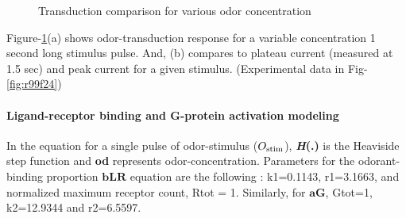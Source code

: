 \documentclass[
]{article}
\begin{document}
\begin{figure}

{\centering {}

}

\caption{Transduction comparison for various odor concentration}\label{fig:txCon}
\end{figure}

Figure-\ref{fig:txCon}(a) shows odor-transduction response for a variable concentration 1 second long stimulus pulse. And, (b) compares to plateau current (measured at 1.5 sec) and peak current for a given stimulus. (Experimental data in Fig-\ref{fig:r99f24})

\hypertarget{ligand-receptor-binding-and-g-protein-activation-modeling}{%
\paragraph*{Ligand-receptor binding and G-protein activation modeling}\label{ligand-receptor-binding-and-g-protein-activation-modeling}}

In the equation for a single pulse of odor-stimulus (\(O_{\rm stim}\)), \textbf{\emph{H}(.)} is the Heaviside step function and \textbf{od} represents odor-concentration. Parameters for the odorant-binding proportion \(\mathbf{bLR}\) equation are the following : k1=0.1143, r1=3.1663, and normalized maximum receptor count, Rtot = 1. Similarly, for \(\mathbf{aG}\), Gtot=1, k2=12.9344 and r2=6.5597.
\end{document}
